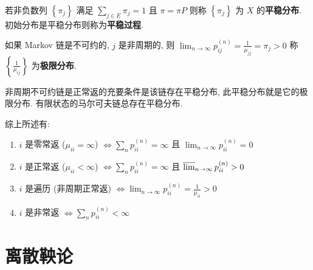 \documentclass[10pt]{yerbaformat}
\begin{document}
\begin{definition}[平稳分布]
    若非负数列 $\left\{\pi_{j}\right\}$ 满足 $\sum_{j \in E} \pi_{j}=1$ 且 $\pi = \pi P$
    则称 $\left\{\pi_{j}\right\}$ 为 $X$ 的\textbf{平稳分布}. 初始分布是平稳分布则称为\textbf{平稳过程}.
\end{definition}

\begin{lemma}
    如果 Markov 链是不可约的, $j$ 是非周期的, 则 $\lim _{n \rightarrow \infty} p_{i j}^{(n)}=\frac{1}{\mu_{j j}} = \pi _{j}>0$ 称 $\left\{\frac{1}{\mu_{i j}}\right\}$ 为\textbf{极限分布}.
\end{lemma}

\begin{theorem}
    非周期不可约链是正常返的充要条件是该链存在平稳分布, 此平稳分布就是它的极限分布. 有限状态的马尔可夫链总存在平稳分布.
\end{theorem}

\par 综上所述有:
\begin{enumerate}
    \item $i$ 是零常返 ($\mu_{i i}=\infty$) $\Leftrightarrow \sum_{n} p_{i i}^{(n)}=\infty$ 且 $\lim _{n \rightarrow \infty} p_{i i}^{(n)}=0$
    \item $i$ 是正常返 ($\mu_{i i}<\infty$) $\Leftrightarrow \sum_{n} p_{i i}^{(n)}=\infty$ 且 $\varlimsup_{n \rightarrow \infty} p_{i i}^{(n)}>0$
    \item $i$ 是遍历 (非周期正常返) $\Leftrightarrow \lim _{n \rightarrow \infty} p_{i i}^{(n)}=\frac{1}{\mu_{i i}}>0$
    \item $i$ 是非常返 $\Leftrightarrow \sum_{n} p_{i i}^{(n)}<\infty $
\end{enumerate}

\section{离散鞅论}
\end{document}

